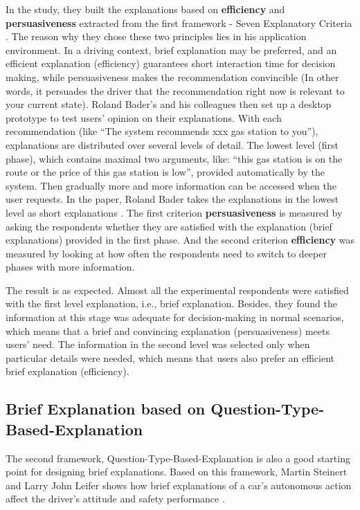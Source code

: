         \indent In the study, they built the explanations based on \textbf{efficiency} and \textbf{persuasiveness} extracted from the first framework - Seven Explanatory Criteria \cite{bader122011explanations}. The reason why they chose these two principles lies in his application environment. In a driving context, brief explanation may be preferred, and an efficient explanation (efficiency) guarantees short interaction time for decision making, while persuasiveness makes the recommendation convincible (In other words, it persuades the driver that the recommendation right now is relevant to your current state). Roland Bader's and his colleagues then set up a desktop prototype to test users' opinion on their explanations. With each recommendation (like ``The system recommends xxx gas station to you''), explanations are distributed over several levels of detail. The lowest level (first phase), which contains maximal two arguments, like: ``this gas station is on the route or the price of this gas station is low'', provided automatically by the system. Then gradually more and more information can be accessed when the user requests. In the paper, Roland Bader takes the explanations in the lowest level as short explanations \cite{bader122011explanations}.   The first criterion \textbf{persuasiveness} is measured by asking the respondents whether they are satisfied with the explanation (brief explanations) provided in the first phase. And the second criterion \textbf{efficiency} was measured by looking at how often the respondents need to switch to deeper phases with more information.

        \indent The result is as expected. Almost all the experimental respondents were satisfied with the first level explanation, i.e., brief explanation. Besides, they found the information at this stage was adequate for decision-making in normal scenarios, which means that a brief and convincing explanation (persuasiveness) meets users' need. The information in the second level was selected only when particular details were needed, which means that users also prefer an efficient brief explanation (efficiency).

    \subsection{Brief Explanation based on Question-Type-Based-Explanation}
    
    \indent The second framework, Question-Type-Based-Explanation is also a good starting point for designing brief explanations. Based on this framework, Martin Steinert and Larry John Leifer shows how brief explanations of a car’s autonomous action affect the driver’s attitude and safety performance \cite{koo2015did}.

